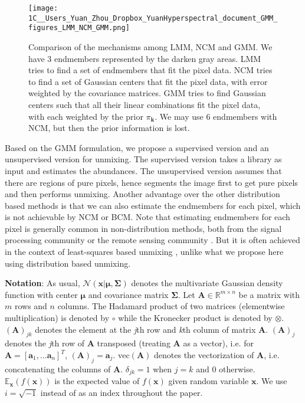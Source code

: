 \documentclass[twocolumn,english]{IEEEtran}
\theoremstyle{plain}
\begin{document}
\begin{figure*}
\begin{centering}
\texttt{[image: 1C\_\_Users\_Yuan\_Zhou\_Dropbox\_YuanHyperspectral\_document\_GMM\_figures\_LMM\_NCM\_GMM.png]}
\par\end{centering}
\caption{Comparison of the mechanisms among LMM, NCM and GMM. We have 3 endmembers
represented by the darken gray areas. LMM tries to find a set of endmembers
that fit the pixel data. NCM tries to find a set of Gaussian centers
that fit the pixel data, with error weighted by the covariance matrices.
GMM tries to find Gaussian centers such that all their linear combinations
fit the pixel data, with each weighted by the prior $\pi_{\mathbf{k}}$.
We may use 6 endmembers with NCM, but then the prior information is
lost.}

\label{fig:LMM_NCM_GMM}
\end{figure*}

Based on the GMM formulation, we propose a supervised version and
an unsupervised version for unmixing. The supervised version takes
a library as input and estimates the abundances. The unsupervised
version assumes that there are regions of pure pixels, hence segments
the image first to get pure pixels and then performs unmixing. Another
advantage over the other distribution based methods is that we can
also estimate the endmembers for each pixel, which is not achievable
by NCM or BCM. Note that estimating endmembers for each pixel is generally
common in non-distribution methods, both from the signal processing
community \cite{thouvenin2016hyperspectral,drumetz2016blind,halimi2016hyperspectral}
or the remote sensing community \cite{roberts1998mapping,combe2008analysis}.
But it is often achieved in the context of least-squares based unmixing
\cite{tits2012potential,iordache2014dynamic,tits2014site}, unlike
what we propose here using distribution based unmixing.

\textbf{Notation}: As usual, $\mathcal{N}\left(\mathbf{x}\vert\boldsymbol{\mu},\boldsymbol{\Sigma}\right)$
denotes the multivariate Gaussian density function with center $\boldsymbol{\mu}$
and covariance matrix $\boldsymbol{\Sigma}$. Let $\mathbf{A}\in\mathbb{R}^{m\times n}$
be a matrix with $m$ rows and $n$ columns. The Hadamard product
of two matrices (elementwise multiplication) is denoted by $\circ$
while the Kronecker product is denoted by $\otimes$. $\left(\mathbf{A}\right)_{jk}$
denotes the element at the \emph{j}th row and \emph{k}th column of
matrix $\mathbf{A}$. $\left(\mathbf{A}\right)_{j}$ denotes the \emph{j}th
row of $\mathbf{A}$ transposed (treating $\mathbf{A}$ as a vector),
i.e. for $\mathbf{A}=\left[\mathbf{a}_{1},\dots\mathbf{a}_{n}\right]^{T}$,
$\left(\mathbf{A}\right)_{j}=\mathbf{a}_{j}$. $\text{vec}\left(\mathbf{A}\right)$
denotes the vectorization of $\mathbf{A}$, i.e. concatenating the
columns of $\mathbf{A}$. $\delta_{jk}=1$ when $j=k$ and 0 otherwise.
$\mathbb{E}_{\mathbf{x}}\left(f\left(\mathbf{x}\right)\right)$ is
the expected value of $f\left(\mathbf{x}\right)$ given random variable
$\mathbf{x}$. We use $i=\sqrt{-1}$ instead of as an index throughout
the paper.
\end{document}
